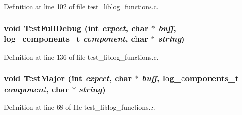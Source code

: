 Definition at line 102 of file test\_\-liblog\_\-functions.c.
\subsubsection[{TestFullDebug}]{\setlength{\rightskip}{0pt plus 5cm}void TestFullDebug (int {\em expect}, \/  char $\ast$ {\em buff}, \/  log\_\-components\_\-t {\em component}, \/  char $\ast$ {\em string})}\label{test__liblog__functions_8c_aa44257fc0da38913e72ec39d98db6bf3}


Definition at line 136 of file test\_\-liblog\_\-functions.c.
\subsubsection[{TestMajor}]{\setlength{\rightskip}{0pt plus 5cm}void TestMajor (int {\em expect}, \/  char $\ast$ {\em buff}, \/  log\_\-components\_\-t {\em component}, \/  char $\ast$ {\em string})}\label{test__liblog__functions_8c_a200212af526e90b5aad633848caa327d}


Definition at line 68 of file test\_\-liblog\_\-functions.c.